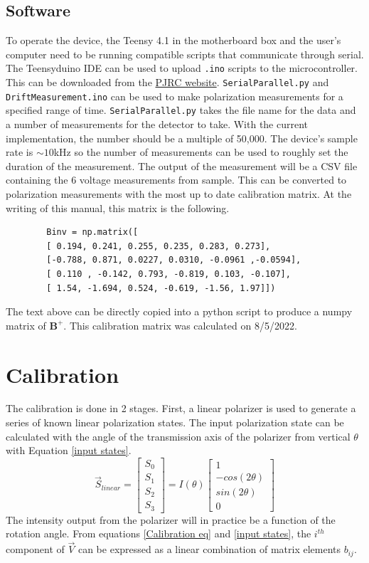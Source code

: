 \documentclass{article}
\begin{document}
\subsection{Software}
To operate the device, the Teensy 4.1 in the motherboard box and the user's computer need to be running compatible scripts that communicate through serial. The Teensyduino IDE can be used to upload \verb|.ino| scripts to the microcontroller. This can be downloaded from the \href{https://www.pjrc.com/teensy/td_download.html}{PJRC website}. \verb|SerialParallel.py| and \verb|DriftMeasurement.ino| can be used to make polarization measurements for a specified range of time. \verb|SerialParallel.py| takes the file name for the data and a number of measurements for the detector to take. With the current implementation, the number should be a multiple of 50,000. The device's sample rate is $\sim10$kHz so the number of measurements can be used to roughly set the duration of the measurement. The output of the measurement will be a CSV file containing the 6 voltage measurements from sample. This can be converted to polarization measurements with the most up to date calibration matrix. At the writing of this manual, this matrix is the following. 
 \begin{verbatim}
        Binv = np.matrix([
        [ 0.194, 0.241, 0.255, 0.235, 0.283, 0.273],
        [-0.788, 0.871, 0.0227, 0.0310, -0.0961 ,-0.0594],
        [ 0.110 , -0.142, 0.793, -0.819, 0.103, -0.107],
        [ 1.54, -1.694, 0.524, -0.619, -1.56, 1.97]])
 \end{verbatim}
The text above can be directly copied into a python script to produce a numpy matrix of $\textbf{B}^{+}$. This calibration matrix was calculated on 8/5/2022.

\section{Calibration}
The calibration is done in 2 stages. First, a linear polarizer is used to generate a series of known linear polarization states. The input polarization state can be calculated with the angle of the transmission axis of the polarizer from vertical $\theta$ with Equation \ref{input states}.
\begin{equation}
\vec{S}_{linear} =
\begin{bmatrix}
S_0\\
S_1\\
S_2\\
S_3
\end{bmatrix}=
I(\theta)\begin{bmatrix} 
1\\
-cos(2\theta)\\
sin(2\theta)\\
0
\end{bmatrix}
\label{input states}
\end{equation}
The intensity output from the polarizer will in practice be a function of the rotation angle. From equations \ref{Calibration eq} and \ref{input states}, the $i^{th}$ component of $\Vec{V}$ can be expressed as a linear combination of matrix elements $b_{ij}$. 
\end{document}
